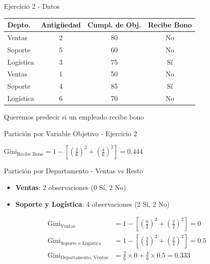 \documentclass{beamer}
\begin{document}
\begin{frame}{Ejercicio 2 - Datos}
    \begin{center}
        \begin{tabular}{lccc}
            \toprule
            Depto. & Antigüedad & Cumpl. de Obj. & Recibe Bono \\
            \midrule
            Ventas    & 2 & 80 & No \\
            Soporte   & 5 & 60 & No \\
            Logística & 3 & 75 & Sí \\
            Ventas    & 1 & 50 & No \\
            Soporte   & 4 & 85 & Sí \\
            Logística & 6 & 70 & No \\
            \bottomrule
        \end{tabular}
    \end{center}
    
    \vspace{1em}
    
    \begin{center}
        \Large Queremos predecir si un empleado recibe bono
    \end{center}
\end{frame}

\begin{frame}{Partición por Variable Objetivo - Ejercicio 2}
    \begin{center}
        \Large $\mathrm{Gini}_{\text{Recibe Bono}} = 1 - \left[\left(\tfrac{2}{6}\right)^2 + \left(\tfrac{4}{6}\right)^2\right] = 0.444$
    \end{center}
\end{frame}

\begin{frame}{Partición por Departamento - Ventas vs Resto}
    \begin{itemize}
        \item \textbf{Ventas}: 2 observaciones (0 Sí, 2 No)
        \item \textbf{Soporte y Logística}: 4 observaciones (2 Sí, 2 No)
    \end{itemize}
    
    \vspace{0.5em}
    
    \begin{align*}
        \mathrm{Gini}_{\text{Ventas}} &= 1 - \left[\left(\tfrac{0}{2}\right)^2 + \left(\tfrac{2}{2}\right)^2\right] = 0 \\
        \mathrm{Gini}_{\text{Soporte y Logística}} &= 1 - \left[\left(\tfrac{2}{4}\right)^2 + \left(\tfrac{2}{4}\right)^2\right] = 0.5 \\
        \mathrm{Gini}_{\text{Departamento, Ventas}} &= \tfrac{2}{6}\times0 + \tfrac{4}{6}\times0.5 = 0.333
    \end{align*}
\end{frame}
\end{document}
